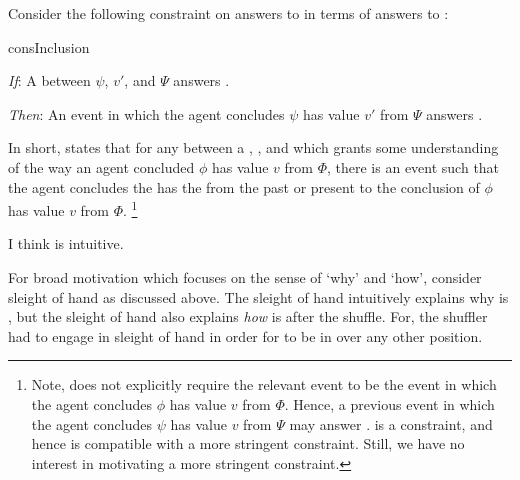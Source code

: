 \begin{note}
  Consider the following constraint on answers to \qWhy{} in terms of answers to \qHow{}:

  \begin{constraint}{consInclusion}{\issueInclusion{}}
    \mbox{ }
    \vspace{-\baselineskip}
    \begin{itenum}
    \item[\emph{If}:]
      A \ros{} between \(\psi\), \(v'\), and \(\Psi\) answers \qWhy{}.
    \item[\emph{Then}:]
      An event in which the agent concludes \(\psi\) has value \(v'\) from \(\Psi\) answers \qHow{}.
    \end{itenum}
    \vspace{-\baselineskip}
  \end{constraint}

  \noindent%
  In short, \issueInclusion{} states that for any \ros{} between a , , and \pool{} which grants some understanding of the way an agent concluded \(\phi\) has value \(v\) from \(\Phi\), there is an event such that the agent concludes the \prop{} has the \val{} from the \pool{} past or present to the \agents{} conclusion of \(\phi\) has value \(v\) from \(\Phi\).%
  \footnote{
    Note, \qHow{} does not explicitly require the relevant event to be the event in which the agent concludes \(\phi\) has value \(v\) from \(\Phi\).
    Hence, a previous event in which the agent concludes \(\psi\) has value \(v\) from \(\Psi\) may answer \qHow{}.
    \issueInclusion{} is a constraint, and hence is compatible with a more stringent constraint.
    Still, we have no interest in motivating a more stringent constraint.
  }
\end{note}


\begin{note}
  I think \issueInclusion{} is intuitive.
\end{note}


\begin{note}
  For broad motivation which focuses on the sense of `why' and `how', consider sleight of hand as discussed above.
  The sleight of hand intuitively explains why \mainCard{} is \mainCardPos{}, but the sleight of hand also explains \emph{how} \mainCard{} is \mainCardPos{} after the shuffle.
  For, the shuffler had to engage in sleight of hand in order for \mainCard{} to be in \mainCardPos{} over any other position.
\end{note}


